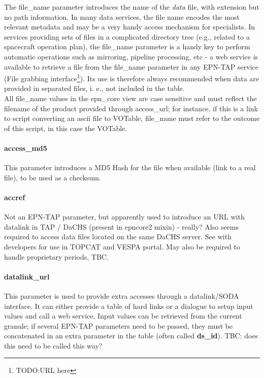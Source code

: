 \documentclass[11pt,a4paper]{ivoa}
\begin{document}
The file\_name parameter introduces the name of the \emph{data} file, with extension but no path information. In many data services, the file name encodes the most relevant metadata and may be a very handy access mechanism for specialists. In services providing sets of files in a complicated directory tree (e.g., related to a spacecraft operation plan), the file\_name parameter is a handy key to perform automatic operations such as mirroring, pipeline processing, etc - a web service is available to retrieve a file from the file\_name parameter in any EPN-TAP service (File grabbing interface\footnote{TODO:URL here}). Its use is therefore always recommended when data are provided in separated files, i. e., not included in the table.\\All file\_name values in the epn\_core view are case sensitive and must reflect the filename of the product provided through access\_url; for instance, if this is a link to script converting an ascii file to VOTable, file\_name must refer to the outcome of this script, in this case the VOTable.

\paragraph{access\_md5}

This parameter introduces a MD5 Hash for the file when available (link to a real file), to be used as a checksum.\\

\paragraph{accref}

Not an EPN-TAP parameter, but apparently used to introduce an URL with datalink in TAP / DaCHS (present in epncore2 mixin) - really? Also seems required to access data files located on the same DaCHS server. See with developers for use in TOPCAT and VESPA portal. May also be required to handle proprietary periods, TBC. \\

\paragraph{datalink\_url}

This parameter is used to provide extra accesses through a datalink/SODA interface. It can either provide a table of hard links or a dialogue to setup input values and call a web service. Input values can be retrieved from the current granule; if several EPN-TAP parameters need to be passed, they must be concatenated in an extra parameter in the table (often called \textbf{ds\_id}). TBC: does this need to be called this way?\\
\end{document}

